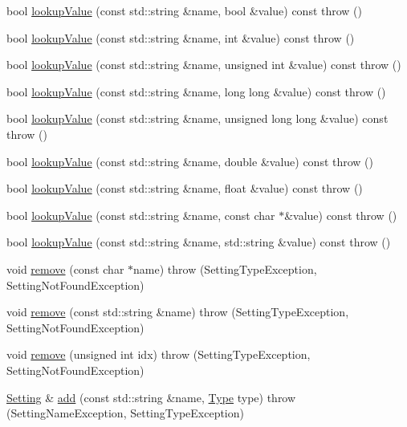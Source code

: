 \begin{DoxyCompactItemize}
\item 
bool \hyperlink{classlibconfig_1_1Setting_a3c795b74c3049e09d1866071c21b8a6a}{lookup\-Value} (const std\-::string \&name, bool \&value) const   throw ()
\item 
bool \hyperlink{classlibconfig_1_1Setting_a434dfb1adeb74e55a80f811f75bb85e0}{lookup\-Value} (const std\-::string \&name, int \&value) const   throw ()
\item 
bool \hyperlink{classlibconfig_1_1Setting_af248d3e213e6c5eb7460cc68c2c8ceb1}{lookup\-Value} (const std\-::string \&name, unsigned int \&value) const   throw ()
\item 
bool \hyperlink{classlibconfig_1_1Setting_a8ac7d72676892a0d77512f00a4d7425b}{lookup\-Value} (const std\-::string \&name, long long \&value) const   throw ()
\item 
bool \hyperlink{classlibconfig_1_1Setting_a38834bf96527b5de10a7b35887600f7e}{lookup\-Value} (const std\-::string \&name, unsigned long long \&value) const   throw ()
\item 
bool \hyperlink{classlibconfig_1_1Setting_a6f1d2d46c121d2d715f6001b35d7a0ea}{lookup\-Value} (const std\-::string \&name, double \&value) const   throw ()
\item 
bool \hyperlink{classlibconfig_1_1Setting_af8a2c987e4b3f277a77b59e1763ddc7b}{lookup\-Value} (const std\-::string \&name, float \&value) const   throw ()
\item 
bool \hyperlink{classlibconfig_1_1Setting_a59603d8123101a3c226b31995693876f}{lookup\-Value} (const std\-::string \&name, const char $\ast$\&value) const   throw ()
\item 
bool \hyperlink{classlibconfig_1_1Setting_a6d4ee07dc366531b9d47e35a84321f2f}{lookup\-Value} (const std\-::string \&name, std\-::string \&value) const   throw ()
\item 
void \hyperlink{classlibconfig_1_1Setting_a52f173e9d7abd9d3e8e0ba4151ed89d1}{remove} (const char $\ast$name)  throw (\-Setting\-Type\-Exception, Setting\-Not\-Found\-Exception)
\item 
void \hyperlink{classlibconfig_1_1Setting_a577708b2a0164024ea88894626b3f24b}{remove} (const std\-::string \&name)  throw (\-Setting\-Type\-Exception, Setting\-Not\-Found\-Exception)
\item 
void \hyperlink{classlibconfig_1_1Setting_abc80ebd07bbca2cc65b37b74a452104a}{remove} (unsigned int idx)  throw (\-Setting\-Type\-Exception, Setting\-Not\-Found\-Exception)
\item 
\hyperlink{classlibconfig_1_1Setting}{Setting} \& \hyperlink{classlibconfig_1_1Setting_ae1860aa1886a488b33da41da33f334f5}{add} (const std\-::string \&name, \hyperlink{classlibconfig_1_1Setting_a42f760ff88654e784477a6f040267bb4}{Type} type)  throw (\-Setting\-Name\-Exception, Setting\-Type\-Exception)

\end{DoxyCompactItemize}
